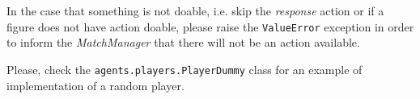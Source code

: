 \documentclass[a4paper]{report}
\begin{document}
	In the case that something is not doable, i.e. skip the \textit{response} action or if a figure does not have action doable, please raise the \texttt{ValueError} exception in order to inform the \textit{MatchManager} that there will not be an action available.

	Please, check the \texttt{agents.players.PlayerDummy} class for an example of implementation of a random player.


	{}
	
\end{document}
